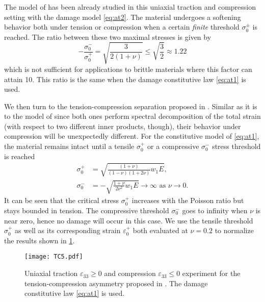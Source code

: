 The model of \cite{AmorMarigoMaurini:2009} has been already studied in this uniaxial traction and compression setting with the damage model \eqref{eq:at2}. The material undergoes a softening behavior both under tension or compression when a certain \emph{finite} threshold $\sigma_0^\pm$ is reached. The ratio between these two maximal stresses is given by
\[
-\frac{\sigma_0^-}{\sigma_0^+}=\sqrt{\frac{3}{2(1+\nu)}}\leq\sqrt{\frac{3}{2}}\approx 1.22
\]
which is not sufficient for applications to brittle materials where this factor can attain 10. This ratio is the same when the damage constitutive law \eqref{eq:at1} is used.

We then turn to the tension-compression separation proposed in \cite{MieheHofackerWelschinger:2010}. Similar as it is to the model of \cite{FreddiRoyer-Carfagni:2010} since both ones perform spectral decomposition of the total strain (with respect to two different inner products, though), their behavior under compression will be unexpectedly different. For the constitutive model of \eqref{eq:at1}, the material remains intact until a tensile $\sigma_0^+$ or a compressive $\sigma_0^-$ stress threshold is reached
\begin{align*}
\sigma_0^+ &= \sqrt{\frac{(1+\nu)}{(1-\nu)(1+2\nu)}w_1E}, \\
\sigma_0^- &= -\sqrt{\frac{1+\nu}{2\nu^2}w_1E}\to\infty\text{ as $\nu\to 0$}.
\end{align*}
It can be seen that the critical stress $\sigma_0^+$ increases with the Poisson ratio but stays bounded in tension. The compressive threshold $\sigma_0^-$ goes to infinity when $\nu$ is near zero, hence no damage will occur in this case. We use the tensile threshold $\sigma_0^+$ as well as its corresponding strain $\varepsilon_0^+$ both evaluated at $\nu=0.2$ to normalize the results shown in \cref{fig:miehe}.
\begin{figure}[htbp]
\centering
\texttt{[image: TC5.pdf]}
\caption{Uniaxial traction $\varepsilon_{33}\geq 0$ and compression $\varepsilon_{33}\leq 0$ experiment for the tension-compression asymmetry proposed in \cite{MieheHofackerWelschinger:2010}. The damage constitutive law \eqref{eq:at1} is used.} \label{fig:miehe}
\end{figure}

